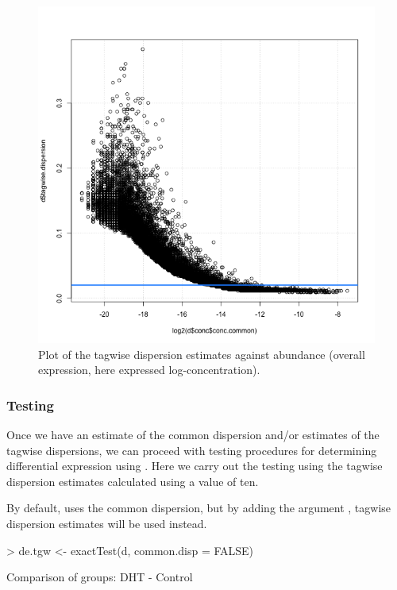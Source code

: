 \begin{figure}[ht]
\begin{center}
\includegraphics{Li_tgw-disp_vs_logconc.png}
\caption{Plot of the tagwise dispersion estimates against abundance
  (overall expression, here expressed log-concentration).}
\label{fig:Li_tgwdisp-vs-abund}
\end{center}
\end{figure}



\subsubsection{Testing}
Once we have an estimate of the common dispersion and/or estimates of
the tagwise dispersions, we can proceed with testing procedures for
determining differential expression using . Here we
carry out the testing using the tagwise dispersion estimates
calculated using a  value of ten.

By default,  uses the common dispersion, but by adding
the argument , tagwise dispersion estimates
will be used instead.

\begin{Schunk}
\begin{Sinput}
> de.tgw <- exactTest(d, common.disp = FALSE)
\end{Sinput}
\begin{Soutput}
Comparison of groups:  DHT - Control 
\end{Soutput}
\end{Schunk}

